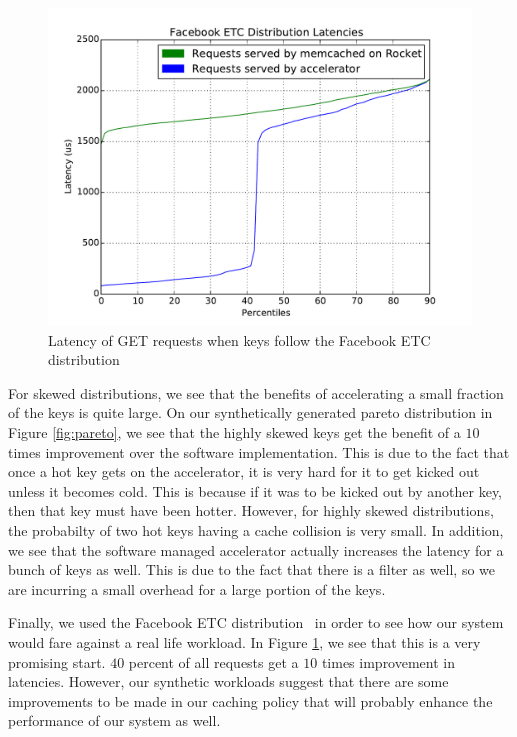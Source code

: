 \begin{figure}[t]
\begin{center}
\includegraphics[width=\linewidth]{etc.pdf}
\caption{Latency of GET requests when keys follow the Facebook ETC distribution}
\label{fig:etc}
\end{center}
\end{figure}

For skewed distributions, we see that the benefits of accelerating a small
fraction of the keys is quite large. On our synthetically generated pareto
distribution in Figure \ref{fig:pareto}, we see that the highly skewed keys get the
benefit of a $10$ times improvement over the software implementation. This is
due to the fact that once a hot key gets on the accelerator, it is very hard
for it to get kicked out unless it becomes cold. This is because if it was to
be kicked out by another key, then that key must have been hotter. However, for
highly skewed distributions, the probabilty of two hot keys having a cache
collision is very small. In addition, we see that the software managed
accelerator actually increases the latency for a bunch of keys as well. This is
due to the fact that there is a filter as well, so we are incurring a small
overhead for a large portion of the keys.

Finally, we used the Facebook ETC distribution~\cite{AXFJP2012} in order to see
how our system would fare against a real life workload. In Figure
\ref{fig:etc}, we see that this is a very promising start. $40$ percent of all
requests get a $10$ times improvement in latencies. However, our synthetic
workloads suggest that there are some improvements to be made in our caching
policy that will probably enhance the performance of our system as well.

